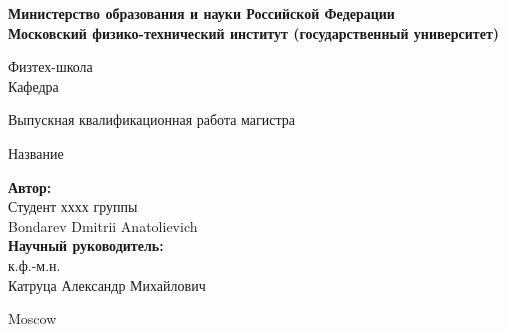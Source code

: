 \begin{center}
    \large\textbf{Министерство образования и науки Российской Федерации \\
    Московский физико-технический институт (государственный
    университет)} \\
    \vspace{1cm}

    Физтех-школа  \\

    Кафедра  \\

    \vspace{3em}

    Выпускная квалификационная работа магистра
\end{center}

\begin{center}
    \vspace{\fill}
    \LARGE{Название}

    \vspace{\fill}
\end{center}


\begin{flushright}
    \textbf{Автор:} \\
    Студент хххх группы \\
    Bondarev Dmitrii Anatolievich \\
    \vspace{2em}
    \textbf{Научный руководитель:} \\
    к.ф.-м.н. \\
    Катруца Александр Михайлович \\
\end{flushright}

\vspace{7em}

\begin{center}
    Moscow \the{}
\end{center}

\thispagestyle{empty}

\newpage
\setcounter{page}{2}
\fancyfoot[c]{\thepage}
\fancyhead[R]{}